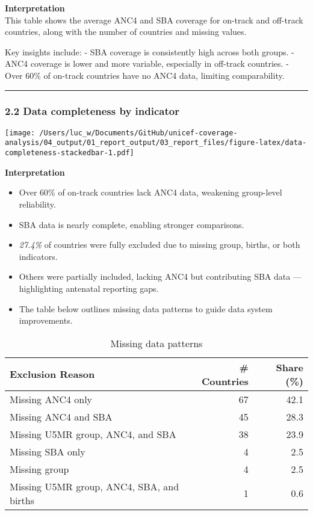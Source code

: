 \documentclass[
]{article}
\begin{document}
\textbf{Interpretation}\\
This table shows the average ANC4 and SBA coverage for on-track and
off-track countries, along with the number of countries and missing
values.

Key insights include: - SBA coverage is consistently high across both
groups. - ANC4 coverage is lower and more variable, especially in
off-track countries. - Over 60\% of on-track countries have no ANC4
data, limiting comparability.

\begin{center}\rule{0.5\linewidth}{0.5pt}\end{center}

\subsubsection{2.2 Data completeness by
indicator}\label{data-completeness-by-indicator}

\texttt{[image: /Users/luc\_w/Documents/GitHub/unicef-coverage-analysis/04\_output/01\_report\_output/03\_report\_files/figure-latex/data-completeness-stackedbar-1.pdf]}

\textbf{Interpretation}

\begin{itemize}
\item
  Over 60\% of on-track countries lack ANC4 data, weakening group-level
  reliability.
\item
  SBA data is nearly complete, enabling stronger comparisons.
\item
  \emph{27.4\%} of countries were fully excluded due to missing group,
  births, or both indicators.
\item
  Others were partially included, lacking ANC4 but contributing SBA data
  --- highlighting antenatal reporting gaps.
\item
  The table below outlines missing data patterns to guide data system
  improvements.
\end{itemize}

\begin{longtable}[t]{lrr}
\caption{\label{tab:exclusion-summary-table}Missing data patterns}\\
\toprule
Exclusion Reason & \# Countries & Share (\%)\\
\midrule
Missing ANC4 only & 67 & 42.1\\
Missing ANC4 and SBA & 45 & 28.3\\
Missing U5MR group, ANC4, and SBA & 38 & 23.9\\
Missing SBA only & 4 & 2.5\\
Missing group & 4 & 2.5\\
\addlinespace
Missing U5MR group, ANC4, SBA, and births & 1 & 0.6\\
\bottomrule
\end{longtable}
\end{document}
